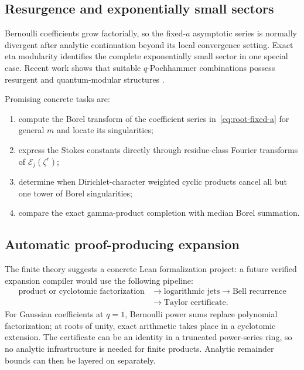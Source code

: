 \documentclass[11pt,oneside]{article}
\theoremstyle{definition}
\theoremstyle{remark}
\let\reportsubsection\subsection
\let\section\reportsubsection
\begin{document}
\section{Resurgence and exponentially small sectors}

Bernoulli coefficients grow factorially, so the fixed-$a$ asymptotic series is
normally divergent after analytic continuation beyond its local convergence
setting.  Exact eta modularity identifies the complete exponentially small
sector in one special case.  Recent work shows that suitable $q$-Pochhammer
combinations possess resurgent and quantum-modular structures
\cite{FantiniRella,ChengComanFantiniRella}.

Promising concrete tasks are:
\begin{enumerate}[label=\textup{(\alph*)}]
\item compute the Borel transform of the coefficient series
      in~\eqref{eq:root-fixed-a} for general $m$ and locate its singularities;
\item express the Stokes constants directly through residue-class Fourier
      transforms of $\mathcal E_j(\zeta^r)$;
\item determine when Dirichlet-character weighted cyclic products cancel all
      but one tower of Borel singularities;
\item compare the exact gamma-product completion
      \cite{ArdehaliRosengren} with median Borel summation.
\end{enumerate}

\section{Automatic proof-producing expansion}

The finite theory suggests a concrete Lean formalization project: a future
verified expansion compiler would use the following pipeline:
\[
 \begin{aligned}
 \text{product or cyclotomic factorization}
 &\longrightarrow \text{logarithmic jets}
 \longrightarrow \text{Bell recurrence}\\
 &\longrightarrow \text{Taylor certificate}.
 \end{aligned}
\]
For Gaussian coefficients at $q=1$, Bernoulli power sums replace polynomial
factorization; at roots of unity, exact arithmetic takes place in a cyclotomic
extension.  The certificate can be an identity in a truncated power-series
ring, so no analytic infrastructure is needed for finite products.  Analytic
remainder bounds can then be layered on separately.
\end{document}
